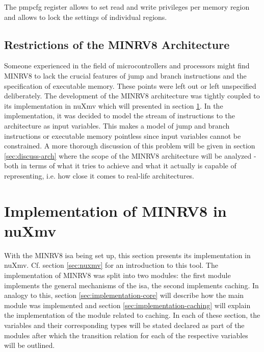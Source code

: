 The \gls{pmpcfg} register allows to set read and write privileges per memory region and allows to lock the settings of individual regions.

\subsection{Restrictions of the MINRV8 Architecture}
\label{sec:minrv8-restrictions}

Someone experienced in the field of microcontrollers and processors might find MINRV8 to lack the crucial features of jump and branch instructions and the specification of executable memory.
These points were left out or left unspecified deliberately.
The development of the MINRV8 architecture was tightly coupled to its implementation in nuXmv which will presented in section \ref{sec:model-implementation}.
In the implementation, it was decided to model the stream of instructions to the architecture as input variables.
This makes a model of jump and branch instructions or executable memory pointless since input variables cannot be constrained.
A more thorough discussion of this problem will be given in section \ref{sec:discuss-arch} where the scope of the MINRV8 architecture will be analyzed - both in terms of what it tries to achieve and what it actually is capable of representing, i.e. how close it comes to real-life architectures.

\section{Implementation of MINRV8 in nuXmv}
\label{sec:model-implementation}

With the MINRV8 \gls{isa} being set up, this section presents its implementation in nuXmv.
Cf. section \ref{sec:nuxmv} for an introduction to this tool.
The implementation of MINRV8 was split into two modules:
the first module implements the general mechanisms of the \gls{isa}, the second implements caching.
In analogy to this, section \ref{sec:implementation-core} will describe how the main module was implemented and section \ref{sec:implementation-caching} will explain the implementation of the module related to caching.
In each of these section, the variables and their corresponding types will be stated declared as part of the modules after which the transition relation for each of the respective variables will be outlined.

